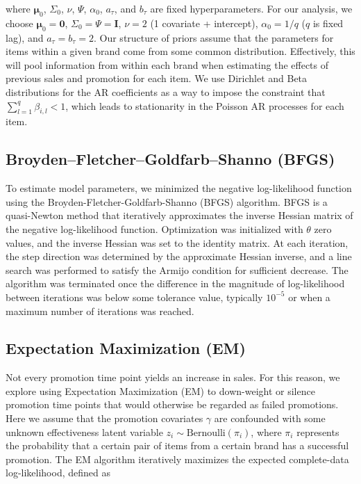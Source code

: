 \documentclass{article}
\begin{document}
\noindent where $\boldsymbol{\mu}_0$, $\Sigma_0$, $\nu$, $\Psi$, $\alpha_0$, $a_{\tau}$, and $b_{\tau}$ are fixed hyperparameters. For our analysis, we choose $\boldsymbol{\mu}_0=\boldsymbol{0}$, $\Sigma_0=\Psi=\mathbf{I}$, $\nu=2$ (1 covariate + intercept), $\alpha_0=1/q$ ($q$ is fixed lag), and $a_{\tau}=b_{\tau}=2$. Our structure of priors assume that the parameters for items within a given brand come from some common distribution. Effectively, this will pool information from within each brand when estimating the effects of previous sales and promotion for each item. We use Dirichlet and Beta distributions for the AR coefficients as a way to impose the constraint that $\sum_{l=1}^q \beta_{i,l} < 1$, which leads to stationarity in the Poisson AR processes for each item.


\subsection{Broyden–Fletcher–Goldfarb–Shanno (BFGS)}

\noindent To estimate model parameters, we minimized the negative log-likelihood function using the Broyden-Fletcher-Goldfarb-Shanno (BFGS) algorithm. BFGS is a quasi-Newton method that iteratively approximates the inverse Hessian matrix of the negative log-likelihood function. Optimization was initialized with $\theta$ zero values, and the inverse Hessian was set to the identity matrix. At each iteration, the step direction was determined by the approximate Hessian inverse, and a line search was performed to satisfy the Armijo condition for sufficient decrease. The algorithm was terminated once the difference in the magnitude of log-likelihood between iterations was below some tolerance value, typically $10^{-5}$ or when a maximum number of iterations was reached.


\subsection{Expectation Maximization (EM)}

\noindent Not every promotion time point yields an increase in sales. For this reason, we explore using Expectation Maximization (EM) to down-weight or silence promotion time points that would otherwise be regarded as failed promotions. Here we assume that the promotion covariates $\gamma$ are confounded with some unknown effectiveness latent variable $z_i \sim \text{Bernoulli}(\pi_i)$, where $\pi_i$ represents the probability that a certain pair of items from a certain brand has a successful promotion. The EM algorithm iteratively maximizes the expected complete-data log-likelihood, defined as
\end{document}

